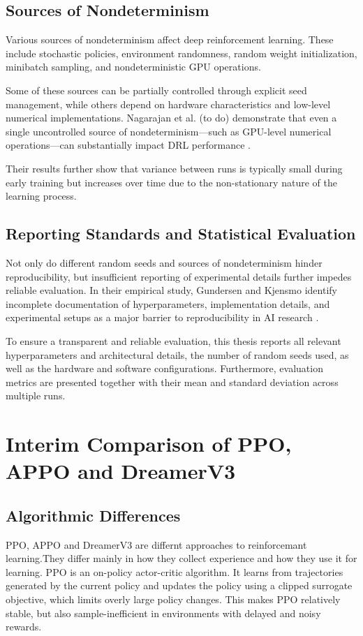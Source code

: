 \documentclass[english,bachelor]{hsluthesis}
\begin{document}
\subsection{Sources of Nondeterminism}
Various sources of nondeterminism affect deep reinforcement learning. 
These include stochastic policies, environment randomness, random weight initialization, minibatch sampling, and nondeterministic GPU operations.

Some of these sources can be partially controlled through explicit seed management, 
while others depend on hardware characteristics and low-level numerical implementations. 
Nagarajan et al. (to do) demonstrate that even a single uncontrolled source of nondeterminism—such as GPU-level numerical operations—can substantially impact DRL performance \cite{Nagarajan2018TheIO}.

Their results further show that variance between runs is typically small during early training 
but increases over time due to the non-stationary nature of the learning process.

\subsection{Reporting Standards and Statistical Evaluation}
Not only do different random seeds and sources of nondeterminism hinder reproducibility, but insufficient reporting of experimental details further impedes reliable evaluation. In their empirical study, Gundersen and Kjensmo identify incomplete documentation of hyperparameters, implementation details, and experimental setups as a major barrier to reproducibility in AI research \cite{Gundersen_Kjensmo_2018}.

To ensure a transparent and reliable evaluation, this thesis reports all relevant 
hyperparameters and architectural details, the number of random seeds used, as well as the hardware and software configurations. Furthermore, evaluation metrics are presented together with their mean and standard deviation across multiple runs.

\section{Interim Comparison of PPO, APPO and DreamerV3}
\subsection{Algorithmic Differences}

PPO, APPO and DreamerV3 are differnt approaches to reinforcemant learning.They differ mainly in how they collect experience and how they use it for learning. PPO is an on-policy actor-critic algorithm. It learns from trajectories generated by the current policy and updates the policy using a clipped surrogate objective, which limits overly large policy changes. This makes PPO relatively stable, but also sample-inefficient in environments with delayed and noisy rewards.
\end{document}
